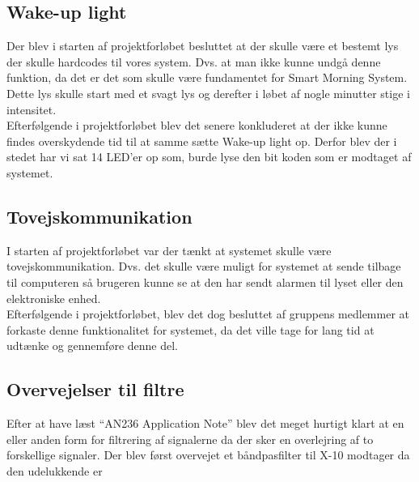 \documentclass[11pt]{article}
\begin{document}
 \subsection*{Wake-up light}
 Der blev i starten af projektforløbet besluttet at der skulle være et bestemt lys der skulle hardcodes til vores system. Dvs. at man ikke kunne undgå denne funktion, da det er det som skulle være fundamentet for Smart Morning System. Dette lys skulle start med et svagt lys og derefter i løbet af nogle minutter stige i intensitet.\\
 Efterfølgende i projektforløbet blev det senere konkluderet at der ikke kunne findes overskydende tid til at samme sætte Wake-up light op. Derfor blev der i stedet har vi sat 14 LED'er op som, burde lyse den bit koden som er modtaget af systemet.

\subsection*{Tovejskommunikation}
I starten af projektforløbet var der tænkt at systemet skulle være tovejskommunikation. Dvs. det skulle være muligt for systemet at sende tilbage til computeren så brugeren kunne se at den har sendt alarmen til lyset eller den elektroniske enhed.\\
Efterfølgende i projektforløbet, blev det dog besluttet af gruppens medlemmer at forkaste denne funktionalitet for systemet, da det ville tage for lang tid at udtænke og gennemføre denne del.

\subsection*{Overvejelser til filtre}
Efter at have læst ``AN236 Application Note'' blev det meget hurtigt klart at en eller anden form for filtrering af signalerne da der sker en overlejring af to forskellige signaler. Der blev først overvejet et båndpasfilter til X-10 modtager da den udelukkende er 
\end{document}
